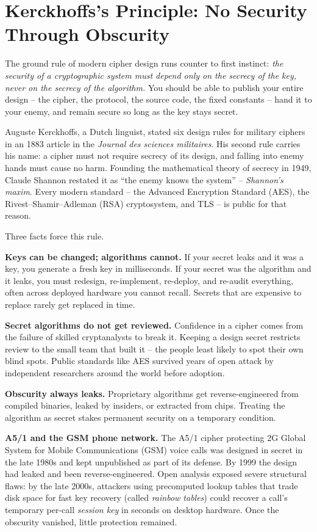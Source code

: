 \section{Kerckhoffs's Principle: No Security Through Obscurity}
\label{ch01:kerckhoffs}

The ground rule of modern cipher design runs counter to first instinct: \emph{the security of a cryptographic system must depend only on the secrecy of the key, never on the secrecy of the algorithm.} You should be able to publish your entire design -- the cipher, the protocol, the source code, the fixed constants -- hand it to your enemy, and remain secure so long as the key stays secret.

Auguste Kerckhoffs, a Dutch linguist, stated six design rules for military ciphers in an 1883 article in the \emph{Journal des sciences militaires}. His second rule carries his name: a cipher must not require secrecy of its design, and falling into enemy hands must cause no harm. Founding the mathematical theory of secrecy in 1949, Claude Shannon restated it as ``the enemy knows the system'' -- \emph{Shannon's maxim}. Every modern standard -- the Advanced Encryption Standard (AES), the Rivest--Shamir--Adleman (RSA) cryptosystem, and TLS -- is public for that reason.

Three facts force this rule.

\textbf{Keys can be changed; algorithms cannot.} If your secret leaks and it was a key, you generate a fresh key in milliseconds. If your secret was the algorithm and it leaks, you must redesign, re-implement, re-deploy, and re-audit everything, often across deployed hardware you cannot recall. Secrets that are expensive to replace rarely get replaced in time.

\textbf{Secret algorithms do not get reviewed.} Confidence in a cipher comes from the failure of skilled cryptanalysts to break it. Keeping a design secret restricts review to the small team that built it -- the people least likely to spot their own blind spots. Public standards like AES survived years of open attack by independent researchers around the world before adoption.

\textbf{Obscurity always leaks.} Proprietary algorithms get reverse-engineered from compiled binaries, leaked by insiders, or extracted from chips. Treating the algorithm as secret stakes permanent security on a temporary condition.

\begin{attackbox}
\textbf{A5/1 and the GSM phone network.} The A5/1 cipher protecting 2G Global System for Mobile Communications (GSM) voice calls was designed in secret in the late 1980s and kept unpublished as part of its defense. By 1999 the design had leaked and been reverse-engineered. Open analysis exposed severe structural flaws: by the late 2000s, attackers using precomputed lookup tables that trade disk space for fast key recovery (called \emph{rainbow tables}) could recover a call's temporary per-call \emph{session key} in seconds on desktop hardware. Once the obscurity vanished, little protection remained.
\end{attackbox}


